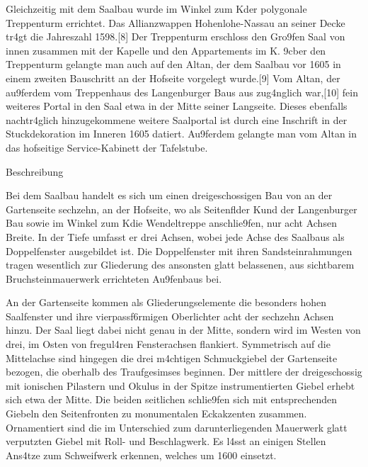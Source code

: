 \documentclass[
  letterpaper,
]{book}
\begin{document}
Gleichzeitig mit dem Saalbau wurde im Winkel zum K\xbcchenbau der
polygonale Treppenturm errichtet. Das Allianzwappen Hohenlohe-Nassau an
seiner Decke tr\xa4gt die Jahreszahl 1598.{[}8{]} Der Treppenturm
erschloss den Gro\x9fen Saal von innen zusammen mit der Kapelle und
den Appartements im K\xbcchenbau. \x9cber den Treppenturm
gelangte man auch auf den Altan, der dem Saalbau vor 1605 in einem
zweiten Bauschritt an der Hofseite vorgelegt wurde.{[}9{]} Vom Altan,
der au\x9ferdem vom Treppenhaus des Langenburger Baus aus
zug\xa4nglich war,{[}10{]} f\xbchrt ein weiteres Portal in den
Saal etwa in der Mitte seiner Langseite. Dieses ebenfalls
nachtr\xa4glich hinzugekommene weitere Saalportal ist durch eine
Inschrift in der Stuckdekoration im Inneren 1605 datiert.
Au\x9ferdem gelangte man vom Altan in das hofseitige
Service-Kabinett der Tafelstube.

Beschreibung

Bei dem Saalbau handelt es sich um einen dreigeschossigen Bau von an der
Gartenseite sechzehn, an der Hofseite, wo als Seitenfl\xbcgel der
K\xbcchenbau und der Langenburger Bau sowie im Winkel zum
K\xbcchenbau die Wendeltreppe anschlie\x9fen, nur acht Achsen
Breite. In der Tiefe umfasst er drei Achsen, wobei jede Achse des
Saalbaus als Doppelfenster ausgebildet ist. Die Doppelfenster mit ihren
Sandsteinrahmungen tragen wesentlich zur Gliederung des ansonsten glatt
belassenen, aus sichtbarem Bruchsteinmauerwerk errichteten
Au\x9fenbaus bei.

An der Gartenseite kommen als Gliederungselemente die besonders hohen
Saalfenster und ihre vierpassf\xb6rmigen Oberlichter
\xbcber acht der sechzehn Achsen hinzu. Der Saal liegt dabei nicht
genau in der Mitte, sondern wird im Westen von drei, im Osten von
f\xbcnf regul\xa4ren Fensterachsen flankiert. Symmetrisch auf
die Mittelachse sind hingegen die drei m\xa4chtigen Schmuckgiebel
der Gartenseite bezogen, die oberhalb des Traufgesimses beginnen. Der
mittlere der dreigeschossig mit ionischen Pilastern und Okulus in der
Spitze instrumentierten Giebel erhebt sich etwa \xbcber der Mitte.
Die beiden seitlichen schlie\x9fen sich mit entsprechenden Giebeln
\xbcber den Seitenfronten zu monumentalen Eckakzenten zusammen.
Ornamentiert sind die im Unterschied zum darunterliegenden Mauerwerk
glatt verputzten Giebel mit Roll- und Beschlagwerk. Es l\xa4sst an
einigen Stellen Ans\xa4tze zum Schweifwerk erkennen, welches um 1600
einsetzt.
\end{document}
